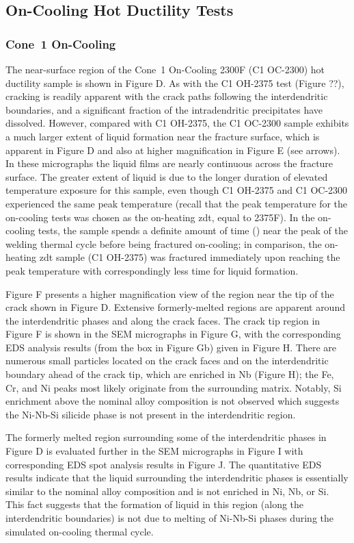 \subsection{On-Cooling Hot Ductility Tests}
\subsubsection{Cone~1 On-Cooling}
The near-surface region of the Cone~1 On-Cooling 2300F (C1 OC-2300) hot ductility sample is shown in Figure D. As with the C1 OH-2375 test (Figure ??), cracking is readily apparent with the crack paths following the interdendritic boundaries, and a significant fraction of the intradendritic precipitates have dissolved. However, compared with C1 OH-2375, the C1 OC-2300 sample exhibits a much larger extent of liquid formation near the fracture surface, which is apparent in Figure D and also at higher magnification in Figure E (see arrows). In these micrographs the liquid films are nearly continuous across the fracture surface. The greater extent of liquid is due to the longer duration of elevated temperature exposure for this sample, even though C1 OH-2375 and C1 OC-2300 experienced the same peak temperature (recall that the peak temperature for the on-cooling tests was chosen as the on-heating \gls{zdt}, equal to 2375\textdegree{}F). In the on-cooling tests, the sample spends a definite amount of time () near the peak of the welding thermal cycle before being fractured on-cooling; in comparison, the on-heating \gls{zdt} sample (C1 OH-2375) was fractured immediately upon reaching the peak temperature with correspondingly less time for liquid formation.

Figure F presents a higher magnification view of the region near the tip of the crack shown in Figure D. Extensive formerly-melted regions are apparent around the interdendritic phases and along the crack faces. The crack tip region in Figure F is shown in the SEM micrographs in Figure G, with the corresponding EDS analysis results (from the box in Figure Gb) given in Figure H. There are numerous small particles located on the crack faces and on the interdendritic boundary ahead of the crack tip, which are enriched in Nb (Figure H); the Fe, Cr, and Ni peaks most likely originate from the surrounding matrix. Notably, Si enrichment above the nominal alloy composition is not observed which suggests the Ni-Nb-Si silicide phase is not present in the interdendritic region. 

The formerly melted region surrounding some of the interdendritic phases in Figure D is evaluated further in the SEM micrographs in Figure I with corresponding EDS spot analysis results in Figure J. The quantitative EDS results indicate that the liquid surrounding the interdendritic phases is essentially similar to the nominal alloy composition and is not enriched in Ni, Nb, or Si. This fact suggests that the formation of liquid in this region (along the interdendritic boundaries) is not due to melting of Ni-Nb-Si phases during the simulated on-cooling thermal cycle.

